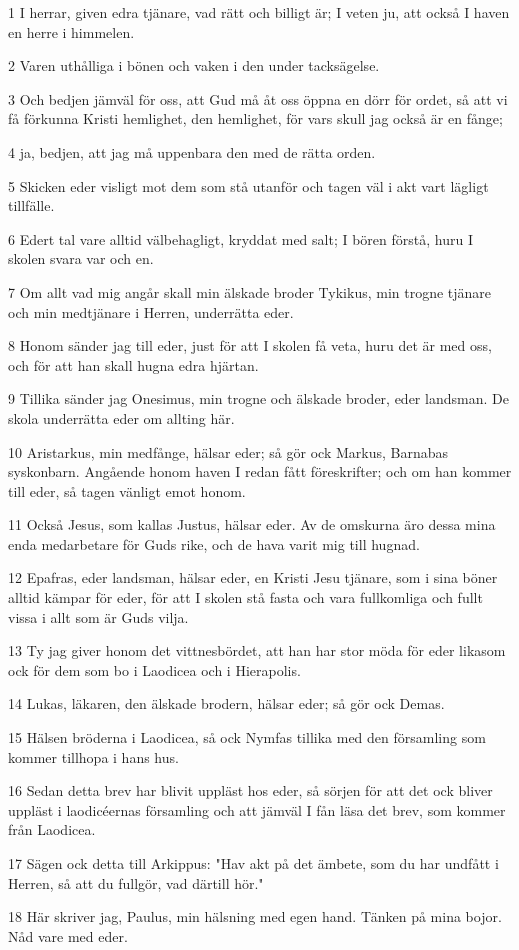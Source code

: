 \par 1 I herrar, given edra tjänare, vad rätt och billigt är; I veten ju, att också I haven en herre i himmelen.
\par 2 Varen uthålliga i bönen och vaken i den under tacksägelse.
\par 3 Och bedjen jämväl för oss, att Gud må åt oss öppna en dörr för ordet, så att vi få förkunna Kristi hemlighet, den hemlighet, för vars skull jag också är en fånge;
\par 4 ja, bedjen, att jag må uppenbara den med de rätta orden.
\par 5 Skicken eder visligt mot dem som stå utanför och tagen väl i akt vart lägligt tillfälle.
\par 6 Edert tal vare alltid välbehagligt, kryddat med salt; I bören förstå, huru I skolen svara var och en.
\par 7 Om allt vad mig angår skall min älskade broder Tykikus, min trogne tjänare och min medtjänare i Herren, underrätta eder.
\par 8 Honom sänder jag till eder, just för att I skolen få veta, huru det är med oss, och för att han skall hugna edra hjärtan.
\par 9 Tillika sänder jag Onesimus, min trogne och älskade broder, eder landsman. De skola underrätta eder om allting här.
\par 10 Aristarkus, min medfånge, hälsar eder; så gör ock Markus, Barnabas syskonbarn. Angående honom haven I redan fått föreskrifter; och om han kommer till eder, så tagen vänligt emot honom.
\par 11 Också Jesus, som kallas Justus, hälsar eder. Av de omskurna äro dessa mina enda medarbetare för Guds rike, och de hava varit mig till hugnad.
\par 12 Epafras, eder landsman, hälsar eder, en Kristi Jesu tjänare, som i sina böner alltid kämpar för eder, för att I skolen stå fasta och vara fullkomliga och fullt vissa i allt som är Guds vilja.
\par 13 Ty jag giver honom det vittnesbördet, att han har stor möda för eder likasom ock för dem som bo i Laodicea och i Hierapolis.
\par 14 Lukas, läkaren, den älskade brodern, hälsar eder; så gör ock Demas.
\par 15 Hälsen bröderna i Laodicea, så ock Nymfas tillika med den församling som kommer tillhopa i hans hus.
\par 16 Sedan detta brev har blivit uppläst hos eder, så sörjen för att det ock bliver uppläst i laodicéernas församling och att jämväl I fån läsa det brev, som kommer från Laodicea.
\par 17 Sägen ock detta till Arkippus: "Hav akt på det ämbete, som du har undfått i Herren, så att du fullgör, vad därtill hör."
\par 18 Här skriver jag, Paulus, min hälsning med egen hand. Tänken på mina bojor. Nåd vare med eder.


